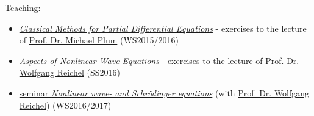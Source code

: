 \noindent Teaching:
\begin{itemize}
  \item \href{http://www.math.kit.edu/iana2/edu/classicmethopde2015w/}{\textsl{Classical Methods for Partial Differential Equations}} - exercises to the lecture of \href{http://www.math.kit.edu/iana2/~plum/}{Prof. Dr. Michael Plum} (WS2015/2016)
  \item \href{http://www.math.kit.edu/iana2/edu/nonlinwave2016s/}{\textsl{Aspects of Nonlinear Wave Equations}} - exercises to the lecture of \href{http://www.math.kit.edu/iana2/~reichel/}{Prof. Dr. Wolfgang Reichel} (SS2016)
  \item \href{http://www.math.kit.edu/iana2/edu/semreichel2016w/de}{seminar \textsl{Nonlinear wave- and Schrödinger equations}} (with \href{http://www.math.kit.edu/iana2/~reichel/}{Prof. Dr. Wolfgang Reichel}) (WS2016/2017)
\end{itemize}
